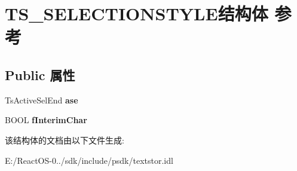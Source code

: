 \hypertarget{struct_t_s___s_e_l_e_c_t_i_o_n_s_t_y_l_e}{}\section{T\+S\+\_\+\+S\+E\+L\+E\+C\+T\+I\+O\+N\+S\+T\+Y\+L\+E结构体 参考}
\label{struct_t_s___s_e_l_e_c_t_i_o_n_s_t_y_l_e}
\subsection*{Public 属性}
\begin{DoxyCompactItemize}
\item 
\mbox{\label{struct_t_s___s_e_l_e_c_t_i_o_n_s_t_y_l_e_aeff45b9da01400de3aa315f740a6f07c}} 
Ts\+Active\+Sel\+End {\bfseries ase}
\item 
\mbox{\label{struct_t_s___s_e_l_e_c_t_i_o_n_s_t_y_l_e_a6ea0d75ad1e8e9858a2eaaa896837518}} 
B\+O\+OL {\bfseries f\+Interim\+Char}
\end{DoxyCompactItemize}


该结构体的文档由以下文件生成\+:\begin{DoxyCompactItemize}
\item 
E\+:/\+React\+O\+S-\/0../sdk/include/psdk/textstor.\+idl\end{DoxyCompactItemize}
